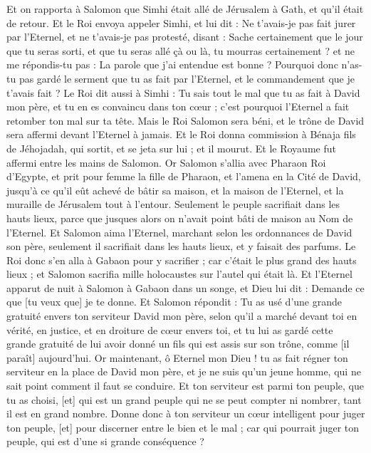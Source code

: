 \begin{multicols}{2}
Et on rapporta à Salomon que Simhi était allé de Jérusalem à Gath, et qu'il était de retour.
Et le Roi envoya appeler Simhi, et lui dit : Ne t'avais-je pas fait jurer par l'Eternel, et ne t'avais-je pas protesté, disant : Sache certainement que le jour que tu seras sorti, et que tu seras allé çà ou là, tu mourras certainement ? et ne me répondis-tu pas : La parole que j'ai entendue est bonne ?
Pourquoi donc n'as-tu pas gardé le serment que tu as fait par l'Eternel, et le commandement que je t'avais fait ?
Le Roi dit aussi à Simhi : Tu sais tout le mal que tu as fait à David mon père, et tu en es convaincu dans ton cœur ; c'est pourquoi l'Eternel a fait retomber ton mal sur ta tête.
Mais le Roi Salomon sera béni, et le trône de David sera affermi devant l'Eternel à jamais.
Et le Roi donna commission à Bénaja fils de Jéhojadah, qui sortit, et se jeta sur lui ; et il mourut. Et le Royaume fut affermi entre les mains de Salomon.
\VerseOne{}Or Salomon s'allia avec Pharaon Roi d'Egypte, et prit pour femme la fille de Pharaon, et l'amena en la Cité de David, jusqu'à ce qu'il eût achevé de bâtir sa maison, et la maison de l'Eternel, et la muraille de Jérusalem tout à l'entour.
Seulement le peuple sacrifiait dans les hauts lieux, parce que jusques alors on n'avait point bâti de maison au Nom de l'Eternel.
Et Salomon aima l'Eternel, marchant selon les ordonnances de David son père, seulement il sacrifiait dans les hauts lieux, et y faisait des parfums.
Le Roi donc s'en alla à Gabaon pour y sacrifier ; car c'était le plus grand des hauts lieux ; et Salomon sacrifia mille holocaustes sur l'autel qui était là.
Et l'Eternel apparut de nuit à Salomon à Gabaon dans un songe, et Dieu lui dit : Demande ce que [tu veux que] je te donne.
Et Salomon répondit : Tu as usé d'une grande gratuité envers ton serviteur David mon père, selon qu'il a marché devant toi en vérité, en justice, et en droiture de cœur envers toi, et tu lui as gardé cette grande gratuité de lui avoir donné un fils qui est assis sur son trône, comme [il paraît] aujourd'hui.
Or maintenant, ô Eternel mon Dieu ! tu as fait régner ton serviteur en la place de David mon père, et je ne suis qu'un jeune homme, qui ne sait point comment il faut se conduire.
Et ton serviteur est parmi ton peuple, que tu as choisi, [et] qui est un grand peuple qui ne se peut compter ni nombrer, tant il est en grand nombre.
Donne donc à ton serviteur un cœur intelligent pour juger ton peuple, [et] pour discerner entre le bien et le mal ; car qui pourrait juger ton peuple, qui est d'une si grande conséquence ?

\end{multicols}
